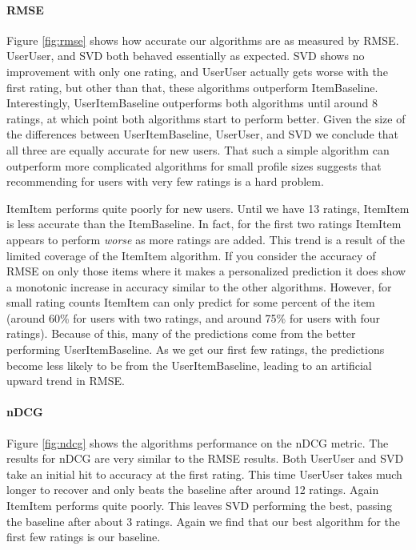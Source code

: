 \documentclass[letterpaper]{sig-alternate}
\begin{document}
  \paragraph{RMSE}
  Figure \ref{fig:rmse} shows how accurate our algorithms are as measured by RMSE.
  UserUser, and SVD both behaved essentially as expected.
  SVD shows no improvement with only one rating, and UserUser actually gets worse with the first rating, but other than that, these algorithms outperform ItemBaseline.
  Interestingly, UserItemBaseline outperforms both algorithms until around 8 ratings, at which point both algorithms start to perform better.
  Given the size of the differences between UserItemBaseline, UserUser, and SVD we conclude that all three are equally accurate for new users.
  That such a simple algorithm can outperform more complicated algorithms for small profile sizes suggests that recommending for users with very few ratings is a hard problem.
  
  ItemItem performs quite poorly for new users.
  Until we have 13 ratings, ItemItem is less accurate than the ItemBaseline.
  In fact, for the first two ratings ItemItem appears to perform \emph{worse} as more ratings are added.
  This trend is a result of the limited coverage of the ItemItem algorithm.
  If you consider the accuracy of RMSE on only those items where it makes a personalized prediction it does show a monotonic increase in accuracy similar to the other algorithms.
  However, for small rating counts ItemItem can only predict for some percent of the item (around 60\% for users with two ratings, and around 75\% for users with four ratings).
  Because of this, many of the predictions come from the better performing UserItemBaseline.
  As we get our first few ratings, the predictions become less likely to be from the UserItemBaseline, leading to an artificial upward trend in RMSE.
  

  \paragraph{nDCG}
  Figure \ref{fig:ndcg} shows the algorithms performance on the nDCG metric.
  The results for nDCG are very similar to the RMSE results.
  Both UserUser and SVD take an initial hit to accuracy at the first rating.
  This time UserUser takes much longer to recover and only beats the baseline after around 12 ratings.
  Again ItemItem performs quite poorly.
  This leaves SVD performing the best, passing the baseline after about 3 ratings.
  Again we find that our best algorithm for the first few ratings is our baseline.
  
\end{document}
